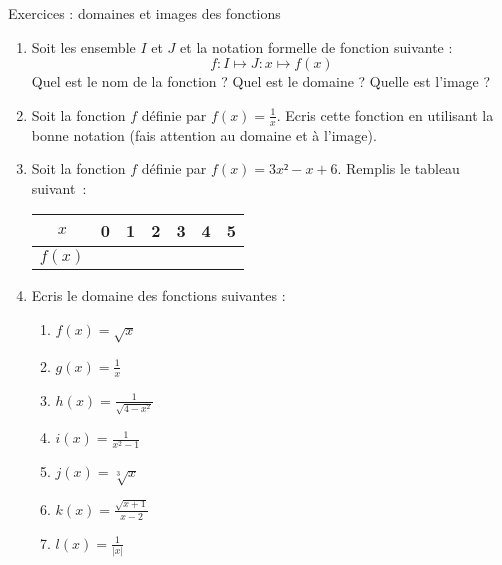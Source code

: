 



	\vspace{3em}
	\begin{center}
			{\Large Exercices : domaines et images des fonctions}
	\end{center}
	
	\vspace{2em}
	
	\begin{enumerate}
		\item 
			Soit les ensemble $I$ et $J$ et la notation formelle de fonction suivante :
				\begin{equation*}
					f : I \mapsto J : x \mapsto f(x)
				\end{equation*}
			Quel est le nom de la fonction ? Quel est le domaine ? Quelle est l'image ?
			
		\item 
			Soit la fonction $f$ définie par $f(x) = \frac{1}{x}$. Ecris cette fonction en utilisant la bonne notation (fais attention au domaine et à l'image).
			
		\item
			Soit la fonction $f$ définie par $f(x) = 3x² - x + 6$. Remplis le tableau suivant~:
			\begin{center}
				\begin{tabular}{c|c|c|c|c|c|c}
					$x$ & 0 & 1 & 2 & 3 & 4 & 5 \\
					\hline
					$f(x)$ & \hspace{1em} & \hspace{1em} & \hspace{1em} & \hspace{1em} & \hspace{1em} & \hspace{1em}
				\end{tabular}
			\end{center}
		
		\item 
			Ecris le domaine des fonctions suivantes :
			\begin{enumerate}
				\item $f(x) = \sqrt{x}$
				\item $g(x) = \frac{1}{x}$
				\item $h(x) = \frac{1}{\sqrt{4 - x^2}}$
				\item $i(x) = \frac{1}{x^2 - 1}$
				\item $j(x) = \sqrt[3]{x}$
				\item $k(x) = \frac{\sqrt{x + 1}}{x - 2}$
				\item $l(x) = \frac{1}{|x|}$
			\end{enumerate}
		

\end{enumerate}
